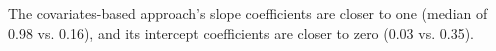 The covariates-based approach's slope coefficients are closer to one (median of 0.98 vs. 0.16), and its intercept coefficients are closer to zero (0.03 vs. 0.35).